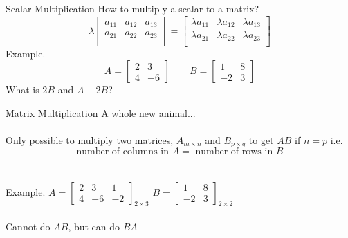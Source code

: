 \documentclass{./../../Latex/teaching_slides}
\begin{document}
\begin{frame}{Scalar Multiplication}
How to multiply a scalar to a matrix? 
$$ \lambda \begin{bmatrix} a_{11} & a_{12} & a_{13} \\ 
a_{21} & a_{22} & a_{23} \\  \end{bmatrix} = \begin{bmatrix} \lambda a_{11} & \lambda a_{12} & \lambda a_{13} \\ 
\lambda a_{21} & \lambda a_{22} & \lambda a_{23} \\  \end{bmatrix} $$
Example.
$$A = \begin{bmatrix}
2 & 3 \\
4 & -6 
\end{bmatrix}  \quad \quad
B = \begin{bmatrix}
1 & 8 \\
-2 & 3
\end{bmatrix}$$
What is $2B$ and $A-2B$?
\end{frame}

\begin{frame}{Matrix Multiplication}
A whole new animal... \\~\\

Only possible to multiply two matrices, $A_{m \times n}$ and $B_{p \times q}$ to get $AB$ if $ n = p $ i.e.
$$\text{number of columns in } A = \text{ number of rows in } B $$ 
\\~\\

Example.
$A = \begin{bmatrix}
2 & 3 & 1 \\
4 & -6 & -2
\end{bmatrix}_{2 \times 3}$ 
$B = \begin{bmatrix}
1 & 8 \\
-2 & 3
\end{bmatrix}_{2 \times 2}$ \\~\\

Cannot do $AB$, but can do $BA$
\end{frame}
\end{document}
